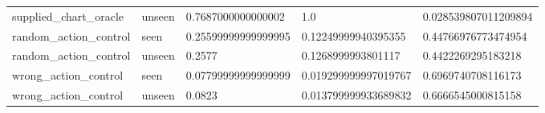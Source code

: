 \begin{table}[t]
\begin{tabular}{lllll}
supplied\_chart\_oracle & unseen & 0.7687000000000002 & 1.0 & 0.028539807011209894 \\
random\_action\_control & seen & 0.25599999999999995 & 0.12249999940395355 & 0.44766976773474954 \\
random\_action\_control & unseen & 0.2577 & 0.1268999993801117 & 0.4422269295183218 \\
wrong\_action\_control & seen & 0.07799999999999999 & 0.019299999997019767 & 0.6969740708116173 \\
wrong\_action\_control & unseen & 0.0823 & 0.013799999933689832 & 0.6666545000815158 \\
\bottomrule
\end{tabular}
\end{table}
